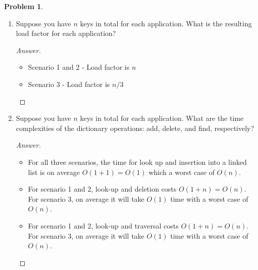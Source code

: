 \documentclass[11pt]{article}
\theoremstyle{definition}
\theoremstyle{definition}
\newtheorem{required}{Problem}
\theoremstyle{definition}
\begin{document}
\begin{required}
\begin{enumerate}[label=(\alph*)]
\begin{proof}[Answer] $ $\\
\begin{itemize}
    \item Scenario 3 follows uniform hashing property will scenario 1 and 2 do not. 
    \item As mentioned in part (a), scenario 1 and 2 have all the keys hashed to one index. This does not satisfy uniform hashing property because one index will have a linked list of n while all other indices will have a linked list of zero. 
    \item Scenario 3 is the only one that satisfies the uniform hashing property because keys can be hashed to any index and this happens randomly which means they will be uniformly distributed. 
\end{itemize}
\end{proof}

\newpage

\item Suppose you have $n$ keys in total for each application. What is the resulting load factor for each application?

\begin{proof}[Answer] $ $\\
\begin{itemize}
    \item Scenario 1 and 2 - Load factor is $n$
    \item Scenario 3 - Load factor is $n/3$
\end{itemize}
\end{proof}

\newpage

\item Suppose you have $n$ keys in total for each application. What are the time complexities of the dictionary operations: add, delete, and find, respectively?

\begin{proof}[Answer] $ $\\
\begin{itemize}
    \item For all three scenarios, the time for look up and insertion into a linked list is on average $O(1+1) = O(1)$ which a worst case of $O(n)$. 
    \item For scenario 1 and 2, look-up and deletion costs $O(1+n) = O(n)$. For scenario 3, on average it will take $O(1)$ time with a worst case of $O(n)$. 
    \item For scenario 1 and 2, look-up and traversal costs $O(1+n) = O(n)$. For scenario 3, on average it will take $O(1)$ time with a worst case of $O(n)$. 
\end{itemize}
\end{proof}

\end{enumerate}
\end{required}







\end{document}
